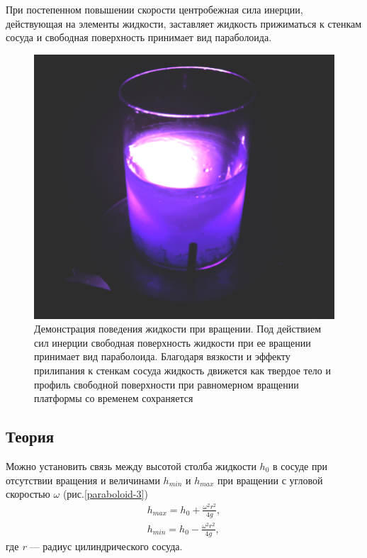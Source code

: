 \documentclass[All.tex]{subfiles}
\begin{document}
При постепенном повышении скорости центробежная сила инерции, действующая на элементы жидкости, заставляет жидкость прижиматься к стенкам сосуда и свободная поверхность принимает вид параболоида. 

\begin{figure}[H] 	
	\centering 	
	\includegraphics[width=0.75\linewidth]{paraboloid-2.png}
	\caption{Демонстрация поведения жидкости при вращении. Под действием сил инерции свободная поверхность жидкости при ее вращении принимает вид параболоида. Благодаря вязкости и эффекту прилипания к стенкам сосуда жидкость движется как твердое тело и профиль свободной поверхности при равномерном вращении платформы со временем сохраняется}
	\label{paraboloid-2}
\end{figure}


\subsection*{\textcolor{PineGreen}{Теория}}

Можно установить связь между высотой столба жидкости $ h_{0} $ в сосуде при отсутствии вращения и величинами $ h_{min} $ и $ h_{max} $ при вращении с угловой скоростью $ \omega $ (рис.\ref{paraboloid-3})
\begin{align}\label{1}
h_{max} = h_{0} + \frac{\omega^{2} r^{2}}{4g}, \\
h_{min} = h_{0} - \frac{\omega^{2} r^{2}}{4g},
\end{align}
где \textit{r} — радиус цилиндрического сосуда.
\end{document}
